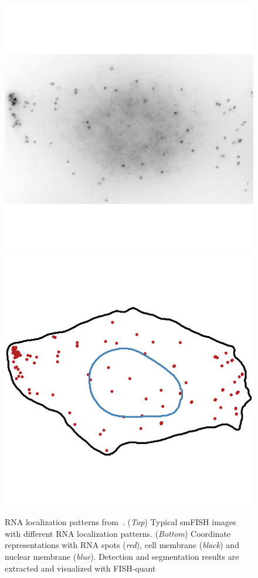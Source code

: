 \begin{figure}[]
		\includegraphics[width=0.95\linewidth]{figures/introduction/real_image_protrusion}
		\vfill
		\includegraphics[width=0.95\linewidth]{figures/introduction/real_coord_protrusion}
	\endminipage
	\caption[RNA localization patterns from pixels to numbers]{RNA localization patterns from~\cite{pointfish_2022}.
	(\textit{Top}) Typical smFISH images with different RNA localization patterns.
	(\textit{Bottom}) Coordinate representations with RNA spots (\textit{red}), cell membrane (\textit{black}) and nuclear membrane (\textit{blue}).
	Detection and segmentation results are extracted and visualized with FISH-quant~\cite{Imbert_fq_2022}}
	\label{fig:intro_localization_patterns}
\end{figure}


